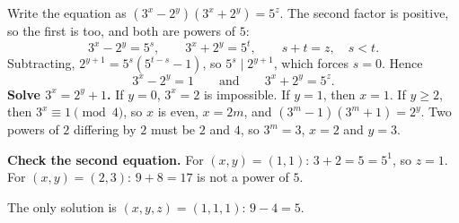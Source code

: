 Write the equation as $\left(3^x-2^y\right)\left(3^x+2^y\right)=5^z$. The second factor is positive, so the first is too, and both are powers of $5$:
\[3^x-2^y=5^s,\qquad3^x+2^y=5^t,\qquad s+t=z,\quad s<t.\]
Subtracting, $2^{y+1}=5^s\left(5^{t-s}-1\right)$, so $5^s\mid2^{y+1}$, which forces $s=0$. Hence
\[3^x-2^y=1\qquad\text{and}\qquad3^x+2^y=5^z.\]
\textbf{Solve $3^x=2^y+1$.} If $y=0$, $3^x=2$ is impossible. If $y=1$, then $x=1$. If $y\ge2$, then $3^x\equiv1\pmod4$, so $x$ is even, $x=2m$, and $\left(3^m-1\right)\left(3^m+1\right)=2^y$. Two powers of $2$ differing by $2$ must be $2$ and $4$, so $3^m=3$, $x=2$ and $y=3$.

\textbf{Check the second equation.} For $(x,y)=(1,1)$: $3+2=5=5^1$, so $z=1$. For $(x,y)=(2,3)$: $9+8=17$ is not a power of $5$.

The only solution is $\boxed{(x,y,z)=(1,1,1)}$: $9-4=5$.
